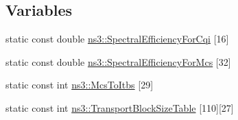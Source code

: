 \subsection*{Variables}
\begin{DoxyCompactItemize}
\item 
static const double \hyperlink{namespacens3_aa667d4abe6d529b6b88203fd52973c8a}{ns3\+::\+Spectral\+Efficiency\+For\+Cqi} \mbox{[}16\mbox{]}
\item 
static const double \hyperlink{namespacens3_aaa522c5b4dc5c1b69cfa3c8b5796cac9}{ns3\+::\+Spectral\+Efficiency\+For\+Mcs} \mbox{[}32\mbox{]}
\item 
static const int \hyperlink{namespacens3_a909f715c4e582620d69e30fe0cd30962}{ns3\+::\+Mcs\+To\+Itbs} \mbox{[}29\mbox{]}
\item 
static const int \hyperlink{namespacens3_a3f2499ae7c455aaa9c96aa58d8fae431}{ns3\+::\+Transport\+Block\+Size\+Table} \mbox{[}110\mbox{]}\mbox{[}27\mbox{]}
\end{DoxyCompactItemize}
